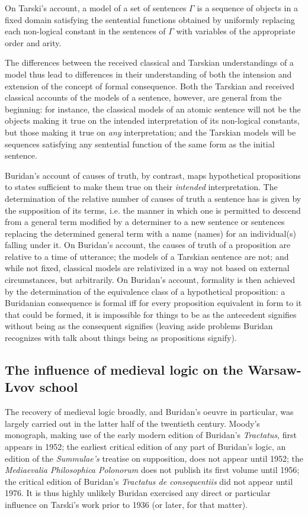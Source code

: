 \documentclass[]{article}
\begin{document}
On Tarski's account, a model of a set of sentences $\Gamma$ is a sequence of objects in a fixed domain satisfying the sentential functions obtained by uniformly replacing each non-logical constant in the sentences of $\Gamma$ with variables of the appropriate order and arity. 

The differences between the received classical and Tarskian understandings of a model thus lead to differences in their understanding of both the intension and extension of the concept of formal consequence. Both the Tarskian and received classical accounts of the models of a sentence, however, are general from the beginning: for instance, the classical models of an atomic sentence will not be the objects making it true on the intended interpretation of its non-logical constants, but those making it true on \textit{any} interpretation; and the Tarskian models will be sequences satisfying any sentential function of the same form as the initial sentence.

Buridan's account of causes of truth, by contrast, maps hypothetical propositions to states sufficient to make them true on their \textit{intended} interpretation. The determination of the relative number of causes of truth a sentence has is given by the supposition of its terms, i.e. the manner in which one is permitted to descend from a general term modified by a determiner to a new sentence or sentences replacing the determined general term with a name (names) for an individual(s) falling under it. On Buridan's account, the causes of truth of a proposition are relative to a time of utterance; the models of a Tarskian sentence are not; and while not fixed, classical models are relativized in a way not based on external circumstances, but arbitrarily. On Buridan's account, formality is then achieved by the determination of the equivalence class of a hypothetical proposition: a Buridanian consequence is formal iff for every proposition equivalent in form to it that could be formed, it is impossible for things to be as the antecedent signifies without being as the consequent signifies (leaving aside problems Buridan recognizes with talk about things being as propositions signify).

\subsection{The influence of medieval logic on the Warsaw-Lvov school}
The recovery of medieval logic broadly, and Buridan's oeuvre in particular, was largely carried out in the latter half of the twentieth century. Moody's monograph, making use of the early modern edition of Buridan's \textit{Tractatus}, first appears in 1952; the earliest critical edition of any part of Buridan's logic, an edition of the \textit{Summulae's} treatise on supposition, does not appear until 1952; the \textit{Mediaevalia Philosophica Polonorum} does not publish its first volume until 1956; the critical edition of Buridan's \textit{Tractatus de consequentiis} did not appear until 1976. It is thus highly unlikely Buridan exercised any direct or particular influence on Tarski's work prior to 1936 (or later, for that matter).
\end{document}
